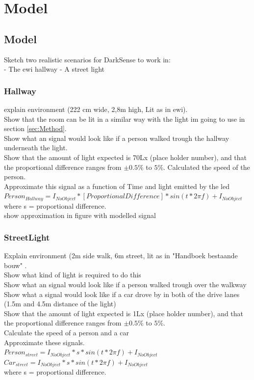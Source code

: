 \chapter{Model}
\label{Model}


\section{Model}
\label{sec:Model}
Sketch two realistic scenarios for DarkSense to work in:\\
- The ewi hallway
- A street light

\subsection{Hallway}
explain environment (222 cm wide, 2,8m high, Lit as in ewi).\\
Show that the room can be lit in a similar way with the light im going to use in section \ref{sec:Method}.\\
Show what an signal would look like if a person walked trough the hallway underneath the light.\\
Show that the amount of light expected is 70Lx (place holder number), and that the proportional difference ranges from $\pm 0.5\%$ to $5\%$.
Calculated the speed of the person.\\
Approximate this signal as a function of Time and light emitted by the led\\
$ Person_{Hallway} = I_{NoObject} * [ProportionalDifference] * sin(t*2\pi f) + I_{NoObject}$\\
where s = proportional difference.\\

show approximation in figure with modelled signal\\

\subsection{StreetLight}
Explain environment (2m side walk, 6m street, lit as in "Handboek bestaande bouw" \cite{HandboekBestaandeBouw}.\\
Show what kind of light is required to do this\\
Show what an signal would look like if a person walked trough over the walkway\\
Show what a signal would look like if a car drove by in both of the drive lanes (1.5m and 4.5m distance of the light)\\
Show that the amount of light expected is 1Lx (place holder number), and that the proportional difference ranges from $\pm 0.5\%$ to $5\%$.\\
Calculate the speed of a person and a car\\
Approximate these signals.\\
$ Person_{street} = I_{NoObject} * s * sin(t*2\pi f) + I_{NoObject}$\\
$ Car_{street} = I_{NoObject} * s * sin(t*2\pi f) + I_{NoObject}$\\
where s = proportional difference.\\

